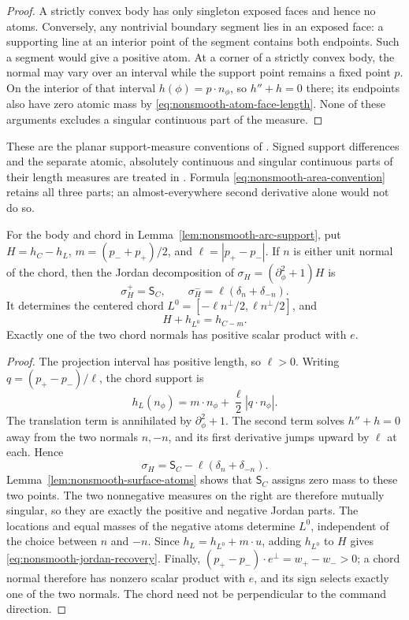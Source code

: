\begin{proof}
A strictly convex body has only singleton exposed faces and
hence no atoms.  Conversely, any nontrivial boundary segment
lies in an exposed face: a supporting line at an interior point
of the segment contains both endpoints.  Such a segment would
give a positive atom.  At a corner of a strictly convex body,
the normal may vary over an interval while the support point
remains a fixed point $p$.  On the interior of that interval
$h(\phi)=p\cdot n_\phi$, so $h''+h=0$ there; its endpoints
also have zero atomic mass by
\eqref{eq:nonsmooth-atom-face-length}.  None of these arguments
excludes a singular continuous part of the measure.
\end{proof}

These are the planar support-measure conventions of
\cite[Chapter~4]{Schneider}.  Signed support differences and the
separate atomic, absolutely continuous and singular continuous
parts of their length measures are treated in
\cite[Section~4]{MartinezMaure}.  Formula
\eqref{eq:nonsmooth-area-convention} retains all three parts;
an almost-everywhere second derivative alone would not do so.

\begin{lemma}
\label{lem:nonsmooth-jordan-chord}
For the body and chord in Lemma~\ref{lem:nonsmooth-arc-support},
put $H=h_C-h_L$, $m=(p_-+p_+)/2$, and
$\ell=|p_+-p_-|$.  If $n$ is either unit normal of the chord,
then the Jordan decomposition of $\sigma_H=(\partial_\phi^2+1)H$
is
\begin{equation}\label{eq:nonsmooth-jordan-parts}
 \sigma_H^+=\mathsf S_C,\qquad
 \sigma_H^-=\ell(\delta_n+\delta_{-n}).
\end{equation}
It determines the centered chord
$L^0=[-\ell n^\perp/2,\ell n^\perp/2]$, and
\begin{equation}\label{eq:nonsmooth-jordan-recovery}
                     H+h_{L^0}=h_{C-m}.
\end{equation}
Exactly one of the two chord normals has positive scalar product
with $e$.
\end{lemma}
\begin{proof}
The projection interval has positive length, so $\ell>0$.
Writing $q=(p_+-p_-)/\ell$, the chord support is
\[
 h_L(n_\phi)=m\cdot n_\phi+\frac\ell2|q\cdot n_\phi|.
\]
The translation term is annihilated by $\partial_\phi^2+1$.
The second term solves $h''+h=0$ away from the two normals
$n,-n$, and its first derivative jumps upward by $\ell$ at
each.  Hence
\[
 \sigma_H=\mathsf S_C-\ell(\delta_n+\delta_{-n}).
\]
Lemma~\ref{lem:nonsmooth-surface-atoms} shows that $\mathsf S_C$
assigns zero mass to these two points.  The two nonnegative
measures on the right are therefore mutually singular, so they
are exactly the positive and negative Jordan parts.  The
locations and equal masses of the negative atoms determine
$L^0$, independent of the choice between $n$ and $-n$.
Since $h_L=h_{L^0}+m\cdot u$, adding $h_{L^0}$ to $H$ gives
\eqref{eq:nonsmooth-jordan-recovery}.  Finally,
$(p_+-p_-)\cdot e^\perp=w_+-w_->0$; a chord normal therefore
has nonzero scalar product with $e$, and its sign selects exactly
one of the two normals.  The chord need not be perpendicular to
the command direction.
\end{proof}
